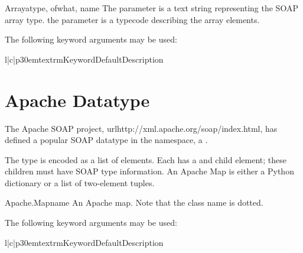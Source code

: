 
\begin{classdesc}{Array}{atype, ofwhat, name}
The  parameter is a text string representing the SOAP array type.
the  parameter is a typecode describing the array elements.
\end{classdesc}

The following keyword arguments may be used:

\begin{tableiii}{l|c|p{30em}}{textrm}{Keyword}{Default}{Description}
\end{tableiii}

\section{Apache Datatype}

The Apache SOAP project, url{http://xml.apache.org/soap/index.html},
has defined a popular SOAP datatype in the 
 namespace, a
.

The  type is encoded as a list of  elements.
Each  has a  and  child element; these
children must have SOAP type information.
An Apache Map is either a Python dictionary or a list of two-element
tuples.

\begin{classdesc}{Apache.Map}{name}
An Apache map.
Note that the class name is dotted.
\end{classdesc}

The following keyword arguments may be used:

\begin{tableiii}{l|c|p{30em}}{textrm}{Keyword}{Default}{Description}
\end{tableiii}
